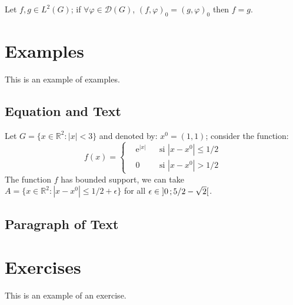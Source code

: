 \documentclass[11pt,fleqn,a5paper]{book} %
\begin{document}
    \begin{proposition} 
    Let $f,g\in L^2(G)$; if $\forall \varphi\in\mathcal{D}(G)$, $(f,\varphi)_0=(g,\varphi)_0$ then $f = g$. 
    \end{proposition}
    
    
    \section{Examples}
    
    This is an example of examples.
    
    \subsection{Equation and Text}
    
    \begin{example}
    Let $G=\{x\in\mathbb{R}^2:|x|<3\}$ and denoted by: $x^0=(1,1)$; consider the function:
    \begin{equation}
    f(x)=\left\{\begin{aligned} & \mathrm{e}^{|x|} & & \text{si $|x-x^0|\leq 1/2$}\\
    & 0 & & \text{si $|x-x^0|> 1/2$}\end{aligned}\right.
    \end{equation}
    The function $f$ has bounded support, we can take $A=\{x\in\mathbb{R}^2:|x-x^0|\leq 1/2+\epsilon\}$ for all $\epsilon\in\mathopen{]}0\,;5/2-\sqrt{2}\mathclose{[}$.
    \end{example}
    
    \subsection{Paragraph of Text}
    
    \begin{example}
    \lipsum[2]
    \end{example}
    
    
    \section{Exercises}
    
    This is an example of an exercise.
    
\end{document}
